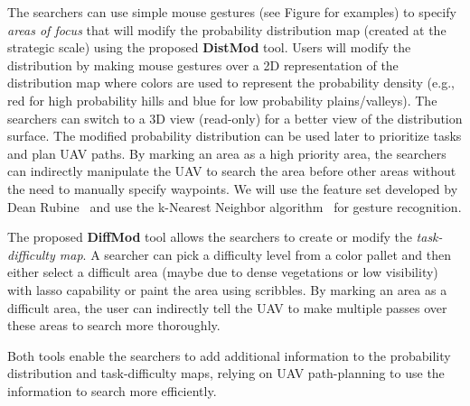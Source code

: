 The searchers can use simple mouse gestures (see Figure  for examples) to specify \textit{areas of focus} that will modify the probability distribution map (created at the strategic scale) using the proposed \textbf{DistMod} tool. Users will modify the distribution by making mouse gestures over a 2D representation of the distribution map where colors are used to represent the probability density (e.g., red for high probability hills and blue for low probability plains/valleys). The searchers can switch to a 3D view (read-only) for a better view of the distribution surface. The modified probability distribution can be used later to prioritize tasks and plan UAV paths. By marking an area as a high priority area, the searchers can indirectly manipulate the UAV to search the area before other areas without the need to manually specify waypoints. We will use the feature set developed by Dean Rubine~\cite{Rubine1991Specifying} and use the k-Nearest Neighbor algorithm~\cite{Mitchell1997Machine} for gesture recognition.

The proposed \textbf{DiffMod} tool allows the searchers to create or modify the \textit{task-difficulty map}. A searcher can pick a difficulty level from a color pallet and then either select a difficult area (maybe due to dense vegetations or low visibility) with lasso capability or paint the area using scribbles. By marking an area as a difficult area, the user can indirectly tell the UAV to make multiple passes over these areas to search more thoroughly.

Both tools enable the searchers to add additional information to the probability distribution and task-difficulty maps, relying on UAV path-planning to use the information to search more efficiently.

